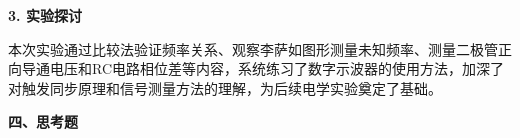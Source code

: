 \documentclass[a4paper,12pt]{article}
\begin{document}
\vspace{0.5cm}

{\fontsize{14pt}{20pt}\selectfont \textbf{3. 实验探讨}}

\vspace{0.3cm}

{\fontsize{12pt}{18pt}\selectfont

本次实验通过比较法验证频率关系、观察李萨如图形测量未知频率、测量二极管正向导通电压和RC电路相位差等内容，系统练习了数字示波器的使用方法，加深了对触发同步原理和信号测量方法的理解，为后续电学实验奠定了基础。

}

\newpage

{\fontsize{16pt}{24pt}\selectfont \textbf{四、思考题}}

\vspace{0.5cm}
\end{document}
